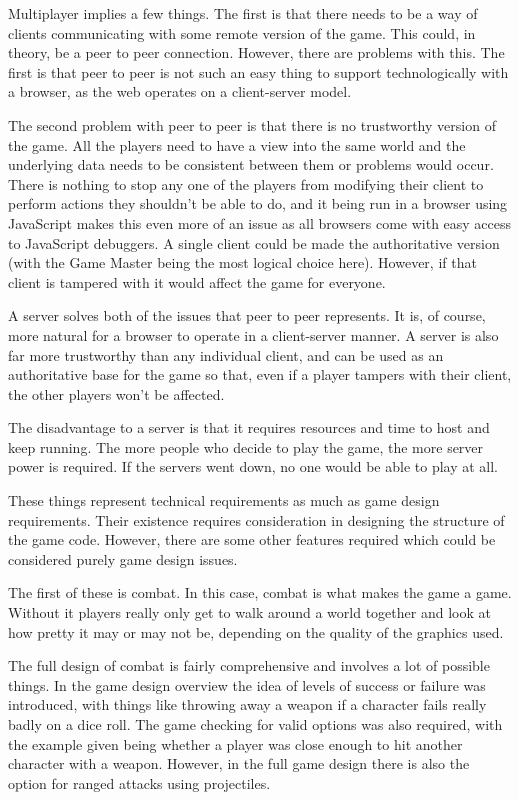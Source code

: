 Multiplayer implies a few things. The first is that there needs to be a way of clients communicating with some remote version of the game. This could, in theory, be a peer to peer connection. However, there are problems with this. The first is that peer to peer is not such an easy thing to support technologically with a browser, as the web operates on a client-server model.

The second problem with peer to peer is that there is no trustworthy version of the game. All the players need to have a view into the same world and the underlying data needs to be consistent between them or problems would occur. There is nothing to stop any one of the players from modifying their client to perform actions they shouldn't be able to do, and it being run in a browser using JavaScript makes this even more of an issue as all browsers come with easy access to JavaScript debuggers. A single client could be made the authoritative version (with the Game Master being the most logical choice here). However, if that client is tampered with it would affect the game for everyone.

A server solves both of the issues that peer to peer represents. It is, of course, more natural for a browser to operate in a client-server manner. A server is also far more trustworthy than any individual client, and can be used as an authoritative base for the game so that, even if a player tampers with their client, the other players won't be affected.

The disadvantage to a server is that it requires resources and time to host and keep running. The more people who decide to play the game, the more server power is required. If the servers went down, no one would be able to play at all.

These things represent technical requirements as much as game design requirements. Their existence requires consideration in designing the structure of the game code. However, there are some other features required which could be considered purely game design issues.

The first of these is combat. In this case, combat is what makes the game a game. Without it players really only get to walk around a world together and look at how pretty it may or may not be, depending on the quality of the graphics used.

The full design of combat is fairly comprehensive and involves a lot of possible things. In the game design overview the idea of levels of success or failure was introduced, with things like throwing away a weapon if a character fails really badly on a dice roll. The game checking for valid options was also required, with the example given being whether a player was close enough to hit another character with a weapon. However, in the full game design there is also the option for ranged attacks using projectiles.

